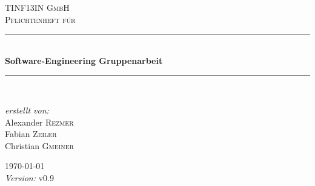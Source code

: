 \begin{titlepage}

\begin{center}



\textsc{\LARGE TINF13IN GmbH}\\[2cm]

\textsc{\Large Pflichtenheft für}\\[1 cm]


\newcommand{\HRule}{\rule{\linewidth}{0.5mm}}
\HRule \\[0.4cm]
{ \huge \bfseries Software-Engineering Gruppenarbeit}\\[0.4cm]

\HRule \\[2.5cm]

\begin{minipage}{0.4\textwidth}
\begin{flushleft} 
\end{flushleft}
\end{minipage}
\hfill
\begin{minipage}{0.4\textwidth}
\begin{flushright} \large
\emph{erstellt von:} \\
Alexander \textsc{Rezmer}\\
Fabian \textsc{Zeiler}\\
Christian \textsc{Gmeiner}
\end{flushright}
\end{minipage}

\vfill

\large
{\large \today\\
\emph{Version:} v0.9}

\end{center}

\end{titlepage}